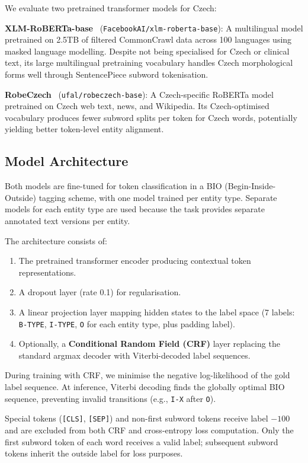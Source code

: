 \documentclass[11pt]{article}
\begin{document}
We evaluate two pretrained transformer models for Czech:

\textbf{XLM-RoBERTa-base}~\cite{conneau-etal-2020-unsupervised} (\texttt{FacebookAI/xlm-roberta-base}):
A multilingual model pretrained on 2.5TB of filtered CommonCrawl data across 100 languages
using masked language modelling. Despite not being specialised for Czech or clinical text,
its large multilingual pretraining vocabulary handles Czech morphological forms well through
SentencePiece subword tokenisation.

\textbf{RobeCzech}~\cite{straka-strakova-2020-robeczech} (\texttt{ufal/robeczech-base}):
A Czech-specific RoBERTa model pretrained on Czech web text, news, and Wikipedia. Its
Czech-optimised vocabulary produces fewer subword splits per token for Czech words,
potentially yielding better token-level entity alignment.

\subsection{Model Architecture}

Both models are fine-tuned for token classification in a BIO (Begin-Inside-Outside) tagging
scheme, with one model trained per entity type. Separate models for each entity type are
used because the task provides separate annotated text versions per entity.

The architecture consists of:
\begin{enumerate}
  \item The pretrained transformer encoder producing contextual token representations.
  \item A dropout layer (rate 0.1) for regularisation.
  \item A linear projection layer mapping hidden states to the label space (7 labels:
        \texttt{B-TYPE}, \texttt{I-TYPE}, \texttt{O} for each entity type, plus padding label).
  \item Optionally, a \textbf{Conditional Random Field (CRF)} layer replacing the
        standard argmax decoder with Viterbi-decoded label sequences.
\end{enumerate}

During training with CRF, we minimise the negative log-likelihood of the gold label
sequence. At inference, Viterbi decoding finds the globally optimal BIO sequence,
preventing invalid transitions (e.g., \texttt{I-X} after \texttt{O}).

Special tokens (\texttt{[CLS]}, \texttt{[SEP]}) and non-first subword tokens receive
label $-100$ and are excluded from both CRF and cross-entropy loss computation.
Only the first subword token of each word receives a valid label; subsequent subword
tokens inherit the outside label for loss purposes.
\end{document}
